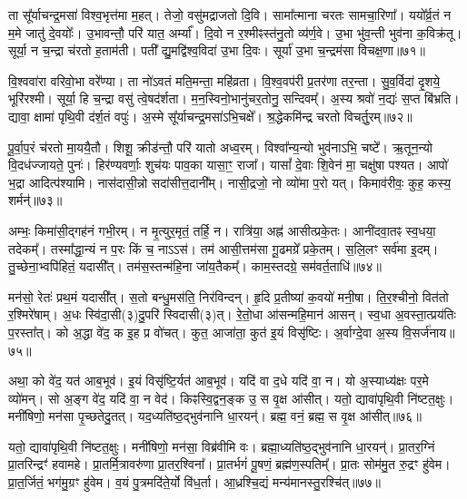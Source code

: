 ता सू᳚र्याचन्द्र॒मसा॑ विश्व॒भृत्त॑मा म॒हत्।
तेजो॒ वसु॑मद्राजतो दि॒वि।
सामा᳚त्माना चरतः सामचा॒रिणा᳚।
ययो᳚र्व्र॒तं न म॒मे जातु॑ दे॒वयोः᳚।
उ॒भावन्तौ॒ परि॑ यात॒ अर्म्या᳚।
दि॒वो न र॒श्मीꣴस्त॑नु॒तो व्य॑र्ण॒वे।
उ॒भा भु॑व॒न्ती भुव॑ना क॒विक्र॑तू।
सूर्या॒ न च॒न्द्रा च॑रतो ह॒ताम॑ती।
पती᳚ द्यु॒मद्वि॑श्व॒विदा॑ उ॒भा दि॒वः।
सूर्या॑ उ॒भा च॒न्द्रम॑सा विचक्ष॒णा॥७१॥\ip

वि॒श्ववा॑रा वरिवो॒भा वरे᳚ण्या।
ता नो॑ऽवतं मति॒मन्ता॒ महि॑व्रता।
वि॒श्व॒वप॑री प्र॒तर॑णा तर॒न्ता।
सु॒व॒र्विदा॑ दृ॒शये॒ भूरि॑रश्मी।
सूर्या॒ हि च॒न्द्रा वसु॑ त्वे॒षद॑र्\mbox{}शता।
म॒न॒स्विनो॒भानु॑चर॒तोनु॒ सन्दिवम्᳚।
अ॒स्य श्रवो॑ न॒द्यः॑ स॒प्त बि॑भ्रति।
द्यावा॒ क्षामा॑ पृथि॒वी द॑र्\mbox{}श॒तं वपुः॑।
अ॒स्मे सू᳚र्याचन्द्र॒मसा॑\-ऽभि॒चक्षे᳚।
श्र॒द्धेकमि॑न्द्र चरतो विचर्तु॒रम्॥७२॥\ip

पू॒र्वा॒प॒रं च॑रतो मा॒ययै॒तौ।
शिशू॒ क्रीड॑न्तौ॒ परि॑ यातो अध्व॒रम्।
विश्वा᳚न्य॒न्यो भुव॑नाऽभि॒ चष्टे᳚।
ऋ॒तून॒न्यो वि॒दध॑ज्जायते॒ पुनः॑।
हिर॑ण्यवर्णाः॒ शुच॑यः पाव॒का यासा॒ꣳ॒ राजा᳚।
यासां᳚ दे॒वाः शि॒वेन॑ मा॒ चक्षु॑षा पश्यत।
आपो॑ भ॒द्रा आदित्प॑श्यामि।
नास॑दासी॒न्नो सदा॑सीत्त॒दानी᳚म्।
नासी॒द्रजो॒ नो व्यो॑मा प॒रो यत्।
किमाव॑रीवः॒ कुह॒ कस्य॒ शर्मन्॑॥७३॥\ip

अम्भः॒ किमा॑सी॒द्गह॑नं गभी॒रम्।
न मृ॒त्युर॒मृतं॒ तर्\mbox{}हि॒ न।
रात्रि॑या॒ अह्न॑ आसीत्प्रके॒तः।
आनी॑दवा॒तꣴ स्व॒धया॒ तदेकम्᳚।
तस्मा᳚द्धा॒न्यं न प॒रः किं च॒ ना\-ऽ\-ऽ\-स॑।
तम॑ आसी॒त्तम॑सा गू॒ढमग्रे᳚ प्रके॒तम्।
स॒लि॒लꣳ सर्व॑मा इ॒दम्।
तु॒च्छेना॒भ्वपि॑हितं॒ यदासी᳚त्।
तम॑स॒स्तन्म॑हि॒ना जा॑य॒तैकम्᳚।
काम॒स्तदग्रे॒ सम॑वर्त॒ताधि॑॥७४॥\ip

मन॑सो॒ रेतः॑ प्रथ॒मं यदासी᳚त्।
स॒तो बन्धु॒मस॑ति॒ निर॑विन्दन्।
हृ॒दि प्र॒तीष्या॑ क॒वयो॑ मनी॒षा।
ति॒र॒श्चीनो॒ वित॑तो र॒श्मिरे॑षाम्।
अ॒धः स्वि॑दा॒सी(३)दु॒परि॑ स्विदासी(३)त्।
रे॒तो॒धा आ॑सन्महि॒मान॑ आसन्।
स्व॒धा अ॒वस्ता॒त्प्रय॑तिः प॒रस्ता᳚त्।
को अ॒द्धा वे॑द॒ क इ॒ह प्र वो॑चत्।
कुत॒ आजा॑ता॒ कुत॑ इ॒यं विसृ॑ष्टिः।
अ॒र्वाग्दे॒वा अ॒स्य वि॒सर्ज॑नाय॥७५॥\ip

अथा॒ को वे॑द॒ यत॑ आब॒भूव॑।
इ॒यं विसृ॑ष्टि॒र्यत॑ आब॒भूव॑।
यदि॑ वा द॒धे यदि॑ वा॒ न।
यो अ॒स्याध्य॑क्षः पर॒मे व्यो॑मन्।
सो अ॒ङ्ग वे॑द॒ यदि॑ वा॒ न वेद॑।
किꣴस्वि॒द्वन॒ङ्क उ॒ स वृ॒क्ष आ॑सीत्।
यतो॒ द्यावा॑पृथि॒वी नि॑ष्टत॒क्षुः।
मनी॑षिणो॒ मन॑सा पृ॒च्छतेदु॒तत्।
यद॒ध्यति॑ष्ठ॒द्भुव॑नानि धा॒रयन्॑।
ब्रह्म॒ वनं॒ ब्रह्म॒ स वृ॒क्ष आ॑सीत्॥७६॥\ip

यतो॒ द्यावा॑पृथि॒वी नि॑ष्टत॒क्षुः।
मनी॑षिणो॒ मन॑सा॒ विब्र॑वीमि वः।
ब्रह्मा॒ध्यति॑ष्ठ॒द्भुव॑नानि धा॒रयन्॑।
प्रा॒तर॒ग्निं प्रा॒तरिन्द्रꣳ॑ हवामहे।
प्रा॒तर्मि॒त्रावरु॑णा प्रा॒तर॒श्विना᳚।
प्रा॒तर्भगं॑ पू॒षणं॒ ब्रह्म॑ण॒स्पतिम्᳚।
प्रा॒तः सोम॑मु॒त रु॒द्रꣳ हु॑वेम।
प्रा॒त॒र्जितं॒ भग॑मु॒ग्रꣳ हु॑वेम।
व॒यं पु॒त्रमदि॑ते॒र्यो वि॑ध॒र्ता।
आ॒ध्रश्चि॒द्यं मन्य॑मानस्तु॒रश्चि॑त्॥७७॥\ip

